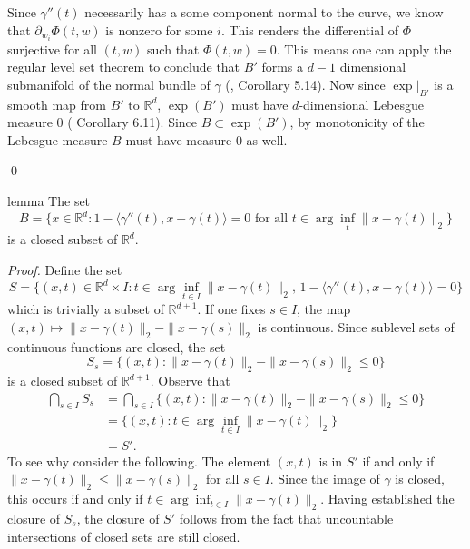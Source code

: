 \documentclass[11pt]{article}
\begin{document}
Since $\gamma''(t)$ necessarily has a some component normal to the curve, we know that $\partial_{w_i}\Phi(t,w)$ is nonzero for some $i$. This renders the differential of $\Phi$ surjective for all $(t,w)$ such that $\Phi(t,w) = 0$. This means one can apply the regular level set theorem to conclude that $B'$ forms a $d-1$ dimensional submanifold of the normal bundle of $\gamma$ (\citet{lee2003smooth}, Corollary 5.14). Now since $\exp\big|_{B'}$ is a smooth map from $B'$ to $\mathbb{R}^d$, $\exp(B')$ must have $d$-dimensional Lebesgue measure $0$ (\citet{lee2003smooth} Corollary 6.11). Since $B \subset \exp(B')$, by monotonicity of the Lebesgue measure $B$ must have measure $0$ as well.

\qed{}


\begin{restatable}{lemma}{} \label{lemma: IFT degen closed}
    The set 
    \begin{equation}
    B = \{x \in \mathbb{R}^d : 1 - \langle\gamma''(t), x-\gamma(t)\rangle = 0 \text{ for all }t \in \arg\inf_t\|x-\gamma(t)\|_2\}
    \end{equation}
    is a closed subset of $\mathbb{R}^d$. 
\end{restatable}

\noindent \textit{Proof.} Define the set
\begin{equation}
S= \{(x,t) \in \mathbb{R}^d\times I : t \in \arg\inf_{t\in I}\|x-\gamma(t)\|_2, \, 1 - \langle\gamma''(t), x - \gamma(t)\rangle = 0\} \label{eq: S}
\end{equation}
which is trivially a subset of $\mathbb{R}^{d+1}$. If one fixes $s \in I$, the map $(x,t) \mapsto \|x-\gamma(t)\|_2 - \|x-\gamma(s)\|_2$ is continuous. Since sublevel sets of continuous functions are closed, the set
\begin{equation}
S_s = \{(x,t) : \|x-\gamma(t)\|_2 - \|x-\gamma(s)\|_2 \leq 0\}
\end{equation}
is a closed subset of $\mathbb{R}^{d+1}$. Observe that
\begin{align*}
    \bigcap_{s \in I} S_s &= \bigcap_{s \in I} \Big\{(x,t) : \|x-\gamma(t)\|_2 - \|x-\gamma(s)\|_2 \leq 0\Big \} \\
    &= \Big\{(x,t) : t\in \arg\inf_{t\in I}\|x-\gamma(t)\|_2 \Big \} \\
    &= S'.
\end{align*}
To see why consider the following. The element $(x,t)$ is in $S'$ if and only if $\|x - \gamma(t)\|_2  \leq \|x - \gamma(s)\|_2$ for all $s \in I$. Since the image of $\gamma$ is closed, this occurs if and only if $t \in \arg\inf_{t \in I} \|x - \gamma(t)\|_2$. Having established the closure of $S_s$, the closure of $S'$ follows from the fact that uncountable intersections of closed sets are still closed. 
\end{document}
